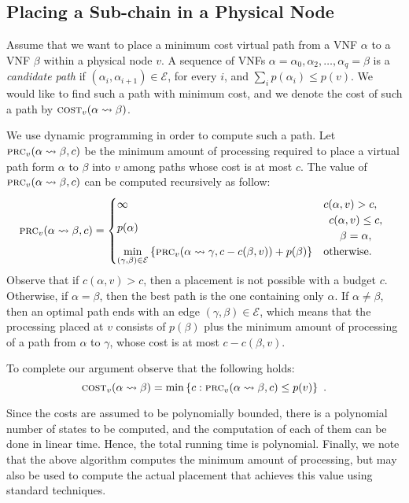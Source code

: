 \documentclass[11pt]{article}
\newcommand{\set}[1]{\left\{ #1 \right\}}
\newcommand{\calE}{\mathcal{E}}
\newcommand{\cost}{\textsc{cost}\xspace}
\newcommand{\process}{\textsc{prc}\xspace}
\begin{document}

\subsection{Placing a Sub-chain in a Physical Node}

Assume that we want to place a minimum cost virtual path from a VNF
$\alpha$ to a VNF $\beta$ within a physical node $v$.  A sequence of
VNFs $\alpha = \alpha_0,\alpha_2,\ldots,\alpha_q = \beta$ is a
\emph{candidate path} if $(\alpha_i,\alpha_{i+1}) \in \calE$, for
every $i$, and $\sum_i p(\alpha_i) \leq p(v)$.  We would like to find
such a path with minimum cost, and we denote the cost of such a path
by $\cost_v(\alpha \leadsto \beta)$.

We use dynamic programming in order to compute such a path.  Let
$\process_v(\alpha \leadsto \beta,c)$ be the minimum amount of
processing required to place a virtual path form $\alpha$ to $\beta$
into $v$ among paths whose cost is at most $c$.
%
The value of $\process_v(\alpha \leadsto \beta,c)$ can be computed
recursively as follow:
\[
\process_v(\alpha \leadsto \beta, c) =
\begin{cases}
\infty    & c(\alpha,v) > c, \\
p(\alpha) &
\begin{array}{c}
c(\alpha,v) \leq c, \\
\beta = \alpha,
\end{array}
\\
\displaystyle
\min_{(\gamma,\beta) \in \calE}
   \set{\process_v(\alpha \leadsto \gamma, c - c(\beta,v)) + p(\beta)}
          & \text{otherwise}.
\end{cases}
\]
Observe that if $c(\alpha,v) > c$, then a placement is not possible
with a budget $c$.  Otherwise, if $\alpha = \beta$, then the best path
is the one containing only $\alpha$.  If $\alpha \neq \beta$, then an
optimal path ends with an edge $(\gamma,\beta) \in \calE$, which means
that the processing placed at $v$ consists of $p(\beta)$ plus the
minimum amount of processing of a path from $\alpha$ to $\gamma$,
whose cost is at most $c - c(\beta,v)$.

To complete our argument observe that the following holds:
\[
\cost_v(\alpha \leadsto \beta)
= \min \set{c : \process_v(\alpha \leadsto \beta, c) \leq p(v)}
~.
\]

Since the costs are assumed to be polynomially bounded, there is a
polynomial number of states to be computed, and the computation of
each of them can be done in linear time.  Hence, the total running
time is polynomial.  Finally, we note that the above algorithm
computes the minimum amount of processing, but may also be used to
compute the actual placement that achieves this value using standard
techniques.
\end{document}
